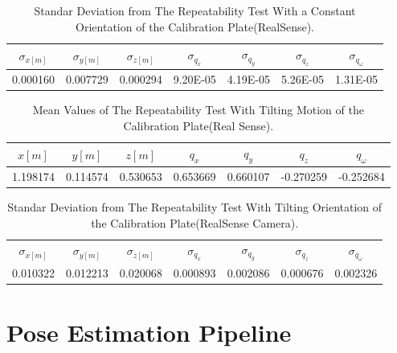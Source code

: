 \begin{table}[b]
\renewcommand{\arraystretch}{1.3}
\caption{Standar Deviation from The Repeatability Test With a Constant Orientation of the Calibration Plate(RealSense).}
\label{standarreal1}
\centering
\begin{tabular}{|c||c||c||c||c||c||c|}
\hline
$\sigma_{x[m]}$ & $\sigma_{y[m]}$ & $\sigma_{z[m]}$ & $\sigma_{q_{x}}$ & $\sigma_{q_{y}}$ & $\sigma_{q_{z}}$ &$\sigma_{q_{\omega}}$ \\
\hline
0.000160&	0.007729&	0.000294&9.20E-05&	4.19E-05&	5.26E-05&	1.31E-05\\
\hline
\hline
\end{tabular}
\end{table}


\begin{table}[b]
\renewcommand{\arraystretch}{1.3}
\caption{Mean Values of The Repeatability Test With Tilting Motion of the Calibration Plate(Real Sense).}
\label{meanreal2}
\centering
\begin{tabular}{|c||c||c||c||c||c||c|}
\hline
$x[m]$ & $y[m]$ & $z[m]$ & $q_{x}$ & $q_{y}$ & $q_{z}$ &$q_{\omega}$ \\
\hline
1.198174&	0.114574&	0.530653& 0.653669&	0.660107&-0.270259&	-0.252684 \\
\hline
\hline
\end{tabular}
\end{table}

\begin{table}[b]
\renewcommand{\arraystretch}{1.3}
\caption{Standar Deviation from The Repeatability Test With Tilting Orientation of the Calibration Plate(RealSense Camera).}
\label{standarreal2}
\centering
\begin{tabular}{|c||c||c||c||c||c||c|}
\hline
$\sigma_{x[m]}$ & $\sigma_{y[m]}$ & $\sigma_{z[m]}$ & $\sigma_{q_{x}}$ & $\sigma_{q_{y}}$ & $\sigma_{q_{z}}$ &$\sigma_{q_{\omega}}$ \\
0.010322&	0.012213&	0.020068&			0.000893&	0.002086&	0.000676&	0.002326\\
\hline
\hline
\end{tabular}
\end{table}



\section{Pose Estimation Pipeline}
